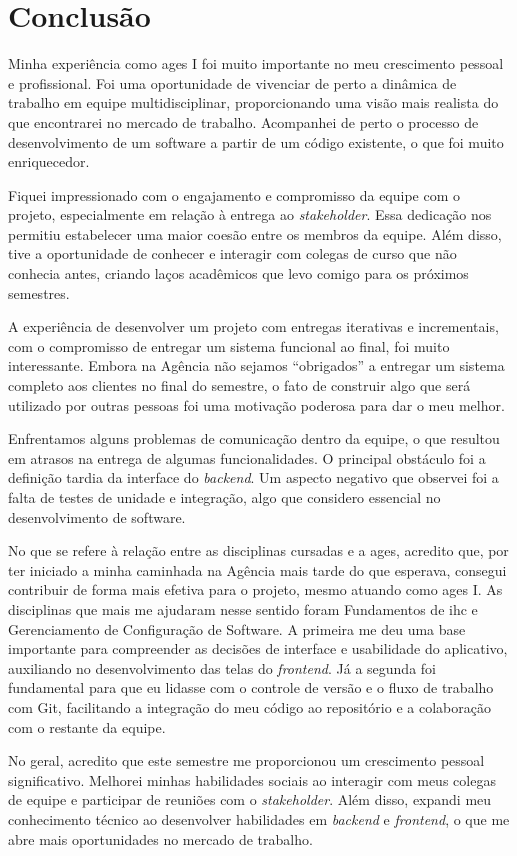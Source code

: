 \section[Conclusão]{Conclusão}

Minha experiência como \ac{ages} I foi muito importante no meu crescimento pessoal e profissional. Foi uma oportunidade de vivenciar de perto a dinâmica de trabalho em equipe multidisciplinar, proporcionando uma visão mais realista do que encontrarei no mercado de trabalho. Acompanhei de perto o processo de desenvolvimento de um software a partir de um código existente, o que foi muito enriquecedor.

Fiquei impressionado com o engajamento e compromisso da equipe com o projeto, especialmente em relação à entrega ao \textit{stakeholder}. Essa dedicação nos permitiu estabelecer uma maior coesão entre os membros da equipe. Além disso, tive a oportunidade de conhecer e interagir com colegas de curso que não conhecia antes, criando laços acadêmicos que levo comigo para os próximos semestres.

A experiência de desenvolver um projeto com entregas iterativas e incrementais, com o compromisso de entregar um sistema funcional ao final, foi muito interessante. Embora na Agência não sejamos ``obrigados'' a entregar um sistema completo aos clientes no final do semestre, o fato de construir algo que será utilizado por outras pessoas foi uma motivação poderosa para dar o meu melhor.

Enfrentamos alguns problemas de comunicação dentro da equipe, o que resultou em atrasos na entrega de algumas funcionalidades. O principal obstáculo foi a definição tardia da interface do \textit{backend}. Um aspecto negativo que observei foi a falta de testes de unidade e integração, algo que considero essencial no desenvolvimento de software.

No que se refere à relação entre as disciplinas cursadas e a \ac{ages}, acredito que, por ter iniciado a minha caminhada na Agência mais tarde do que esperava, consegui contribuir de forma mais efetiva para o projeto, mesmo atuando como \ac{ages} I. As disciplinas que mais me ajudaram nesse sentido foram Fundamentos de \ac{ihc} e Gerenciamento de Configuração de Software. A primeira me deu uma base importante para compreender as decisões de interface e usabilidade do aplicativo, auxiliando no desenvolvimento das telas do \textit{frontend}. Já a segunda foi fundamental para que eu lidasse com o controle de versão e o fluxo de trabalho com Git, facilitando a integração do meu código ao repositório e a colaboração com o restante da equipe.

No geral, acredito que este semestre me proporcionou um crescimento pessoal significativo. Melhorei minhas habilidades sociais ao interagir com meus colegas de equipe e participar de reuniões com o \textit{stakeholder}. Além disso, expandi meu conhecimento técnico ao desenvolver habilidades em \textit{backend} e \textit{frontend}, o que me abre mais oportunidades no mercado de trabalho.